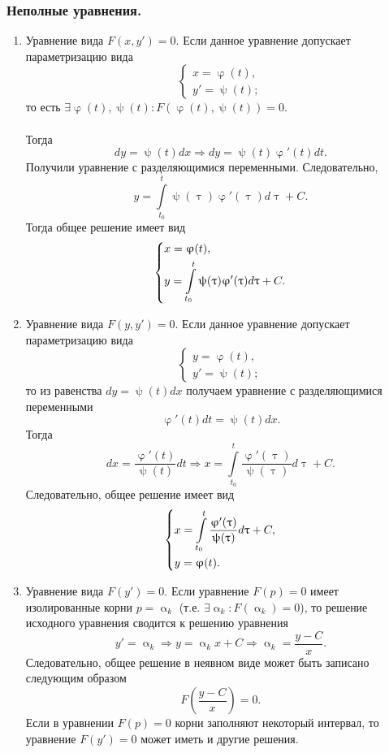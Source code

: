 \documentclass[a4paper, 12pt]{report}
\renewcommand{\alpha}{\upalpha}
\renewcommand{\varphi}{\upvarphi}
\renewcommand{\tau}{\uptau}
\renewcommand{\psi}{\uppsi}
\begin{document}
\subsubsection{Неполные уравнения.}
\begin{enumerate}
	\item Уравнение вида $F(x,y') = 0$. Если данное уравнение допускает параметризацию вида $$\begin{cases}
		x = \varphi(t),\\
		y' = \psi(t);
	\end{cases}$$
то есть $\exists \varphi(t), \psi(t) : F(\varphi(t),\psi(t)) = 0$.\\\\
Тогда $$dy = \psi(t)dx \Rightarrow dy = \psi(t)\varphi'(t)dt.$$
Получили уравнение с разделяющимися переменными. Следовательно, $$y = \int\limits_{t_0}^t \psi(\tau)\varphi'(\tau) d\tau + C.$$
Тогда общее решение имеет вид 
$$\begin{dcases}
	x = \varphi(t),\\
	y = \int\limits_{t_0}^t \psi(\tau)\varphi'(\tau) d\tau + C.
\end{dcases}$$
\item Уравнение вида $F(y,y') = 0$. Если данное уравнение допускает параметризацию вида
$$\begin{cases}
	y = \varphi(t),\\
	y' = \psi(t);
\end{cases}$$ то из равенства $dy = \psi(t)dx$ получаем уравнение с разделяющимися переменными $$\varphi'(t)dt =\psi(t)dx. $$
Тогда $$dx = \dfrac{\varphi'(t)}{\psi(t)}dt \Rightarrow x = \int\limits_{t_0}^t \dfrac{\varphi'(\tau)}{\psi(\tau)}d\tau + C.$$
Следовательно, общее решение имеет вид 
$$\begin{dcases}
	x = \int\limits_{t_0}^t \dfrac{\varphi'(\tau)}{\psi(\tau)}d\tau + C,\\
	y = \varphi(t).
\end{dcases}$$
\item Уравнение вида $F(y') = 0$. Если уравнение $F(p) = 0$ имеет изолированные корни $p = \alpha _k$ (т.е. $\exists \alpha _k : F(\alpha_k) = 0$), то решение исходного уравнения сводится к решению уравнения $$y' = \alpha_k \Rightarrow y = \alpha_k x + C \Rightarrow \alpha_k = \dfrac{y - C}{x}.$$
Следовательно, общее решение в неявном виде может быть записано следующим образом $$F\left(\dfrac{y - C}{x}\right) = 0.$$
Если в уравнении $F(p) = 0$ корни заполняют некоторый интервал, то уравнение $F(y') = 0$ может иметь и другие решения.
\end{enumerate}
\end{document}
